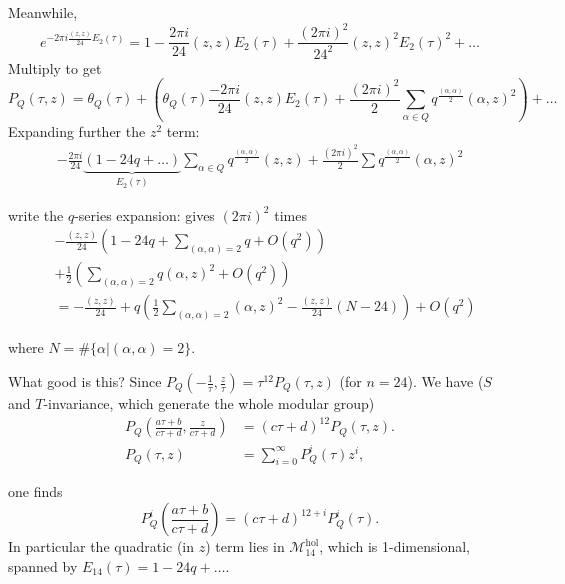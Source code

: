 \noindent
Meanwhile,
$$
e^{-2\pi i \frac{(z,z)}{24}E_2(\tau)}
=1-\frac{2\pi i}{24}(z,z)E_2(\tau)
+\frac{(2\pi i)^2}{24^2}(z,z)^2E_2(\tau)^2+\ldots
$$
Multiply to get
$$
P_Q(\tau,z)=\theta_Q(\tau)+
\left(\theta_Q(\tau)\frac{-2\pi i}{24}(z,z)E_2(\tau)
+\frac{(2\pi i)^2}{2}
\sum_{\alpha \in Q}q^{\frac{(\alpha,\alpha)}{2}}(\alpha,z)^2\right)+\ldots
$$
Expanding further the $z^2$ term:
\begin{align*}
-\frac{2\pi i}{24}\underbrace{(1-24q+\ldots)
}_{E_2(\tau)}
\sum_{\alpha \in Q}q^{\frac{(\alpha,\alpha)}{2}}(z,z)
+\frac{(2\pi i)^2}{2}\sum q^{\frac{(\alpha,\alpha)}{2}}(\alpha,z)^2
\end{align*}

\noindent
write the $q$-series expansion:
gives $(2\pi i)^2$ times
\begin{equation}
\label{equation-e14}\begin{aligned}
&-\frac{(z,z)}{24}\left(1-24q
+\sum_{(\alpha,\alpha)=2}q+O(q^2)\right)\\
&+\frac{1}{2}\left(
\sum_{(\alpha,\alpha)=2}q(\alpha,z)^2+O(q^2)\right)\\
&=-\frac{(z,z)}{24}
+q\left(\frac{1}{2}\sum_{(\alpha,\alpha)=2}(\alpha,z)^2
-\frac{(z,z)}{24}(N-24)\right)
+O(q^2)
\end{aligned}
\end{equation}

\noindent
where $N=\#\{\alpha|(\alpha,\alpha)=2\}$.

\medskip\noindent
What good is this?
Since $P_Q\left(-\frac{1}{\tau},\frac{z}{\tau}\right)
=\tau^{12}P_Q(\tau,z)$ (for $n=24$).
We have ($S$ and $T$-invariance, which generate
the whole modular group)
\begin{align*}
P_Q\left(\frac{a\tau+b}{c\tau+d},\frac{z}{c\tau+d}\right)
&=(c\tau+d)^{12}P_Q(\tau,z).\\
P_Q(\tau,z)&=
\sum_{i=0}^\infty P_Q^i(\tau)z^i,
\end{align*}

\noindent
one finds
$$
P_Q^i\left(\frac{a\tau+b}{c\tau+d}\right)
=(c\tau+d)^{12+i}P_Q^i(\tau).
$$
In particular the quadratic (in $z$)
term lies in $\mathcal{M}^{\text{hol}}_{14}$,
which is 1-dimensional, spanned by $E_{14}(\tau)=1-24q+\ldots$.

